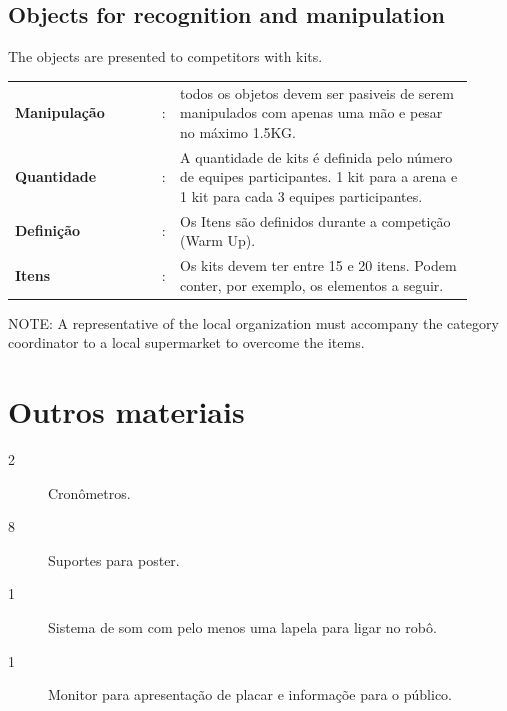 \documentclass[11pt, twoside, openright, a4paper, chapterprefix]{article}
\begin{document}
\subsection{Objects for recognition and manipulation}

The objects are presented to competitors with kits.

\begin{tabular}{ p{0.3\linewidth} p{0.01\linewidth} p{0.6\linewidth}}
    \textbf{Manipulação}   & : & todos os objetos devem ser pasiveis de serem manipulados com apenas uma mão e pesar no máximo 1.5KG. \\
    \textbf{Quantidade}     & : & A quantidade de kits é definida pelo número de equipes participantes. 1 kit para a arena e 1 kit para cada 3 equipes participantes. \\
    \textbf{Definição}       & : & Os Itens são definidos durante a competição (Warm Up). \\
    \textbf{Itens}                & : & Os kits devem ter entre 15 e 20 itens. Podem conter, por exemplo, os elementos a seguir. 
\end{tabular}


NOTE: A representative of the local organization must accompany the category coordinator to a local supermarket to overcome the items.

\section{Outros materiais}

\begin{description}
    \item [2] Cronômetros.
    \item [8] Suportes para poster.
    \item [1] Sistema de som com pelo menos uma lapela para ligar no robô.    
    \item [1] Monitor para apresentação de placar e informaçõe para o público.
\end{description}
\end{document}

